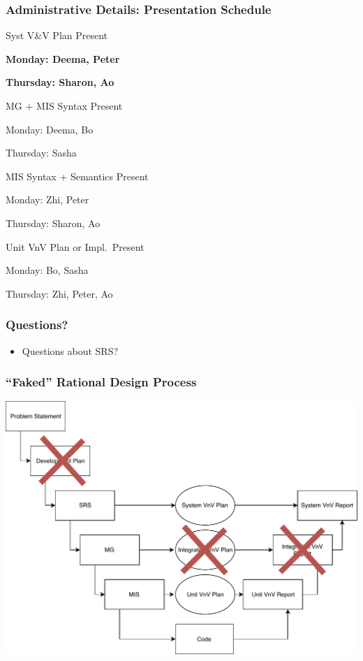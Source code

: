 \documentclass[t,12pt,numbers,fleqn]{beamer}
\begin{document}
\begin{frame}
\frametitle{Administrative Details: Presentation Schedule}

\bi
\item Syst V\&V Plan Present
\bi
\item \textbf{Monday: Deema, Peter}
\item \textbf{Thursday: Sharon, Ao}
\ei
\item MG + MIS Syntax Present
\bi
\item Monday:  Deema, Bo
\item Thursday: Sasha
\ei
\item MIS Syntax + Semantics Present
\bi
\item Monday: Zhi, Peter
\item Thursday:  Sharon, Ao
\ei
\item Unit VnV Plan or Impl.\ Present
\bi
\item Monday: Bo, Sasha
\item Thursday: Zhi, Peter, Ao
\ei
\ei

\end{frame}


\begin{frame}
\frametitle{Questions?}
\begin{itemize}
\item Questions about SRS?
\end{itemize}
\end{frame}

\begin{frame}
\frametitle{``Faked'' Rational Design Process}

\begin{center}
\includegraphics[scale=0.55]{../Figures/VModelOfProcessXOut.pdf}
\end{center}
\vspace{-1.0cm}

\end{frame}
\end{document}
